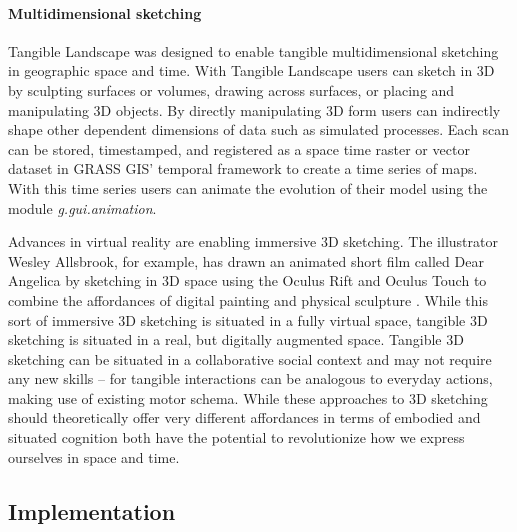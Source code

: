 \documentclass[prodmode,acmtochi]{acmsmall} %
\begin{document}
\paragraph{Multidimensional sketching}
%
Tangible Landscape was designed to enable tangible multidimensional sketching
in geographic space and time. 
%
With Tangible Landscape users can sketch in 3D
by sculpting surfaces or volumes,
drawing across surfaces, 
or placing and manipulating 3D objects.
%
By directly manipulating 3D form 
users can indirectly shape other dependent dimensions of data 
such as simulated processes. 
%
Each scan can be stored, timestamped, and registered
as a space time raster or vector dataset %
in GRASS GIS' temporal framework
to create a time series of maps. 
%
With this time series users can animate the evolution of their model using the module 
\emph{g.gui.animation}\cite{g.gui.animation}.


Advances in virtual reality are enabling immersive 3D sketching.
%
The illustrator
Wesley Allsbrook, %
for example, 
has drawn an animated short film called Dear Angelica
by sketching in 3D space using the Oculus Rift and Oculus Touch
to combine the affordances of digital painting and physical sculpture \cite{Oculus2016,Quilez2016}. 
%
While this sort of immersive 3D sketching is situated in a fully virtual space,
tangible 3D sketching is situated in a real, but digitally augmented space. 
%
Tangible 3D sketching
can be situated in a collaborative social context
and may not require any new skills -- 
for tangible interactions 
can be analogous to everyday actions, 
making use of existing motor schema.
%
While these approaches to 3D sketching 
should theoretically offer very different affordances
in terms of embodied and situated cognition
both have the potential to revolutionize how we 
express ourselves in space and time.

\subsection{Implementation}

% 
% 
\end{document}
